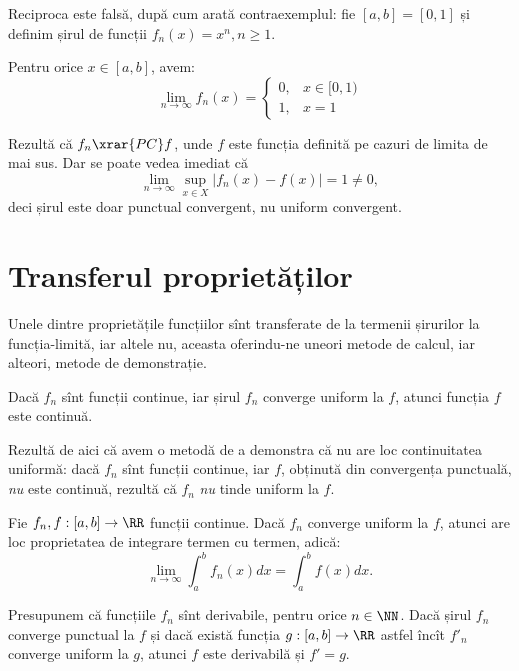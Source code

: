 Reciproca este falsă, după cum arată contraexemplul: fie $ [a, b] = [0,1] $
și definim șirul de funcții $ f_n(x) = x^n, n \geq 1 $.

Pentru orice $ x \in [a, b] $, avem:
\[
  \lim_{n \to \infty} f_n(x) = %
  \begin{cases}
    0, & x \in [0, 1) \\
    1, & x = 1
  \end{cases}
\]

Rezultă că $ f_n \xrar{PC} f $, unde $ f $ este funcția definită pe
cazuri de limita de mai sus. Dar se poate vedea imediat că
\[
  \lim_{n \to \infty} \sup_{x \in X} |f_n(x) - f(x)| = 1 \neq 0,
\]
deci șirul este doar punctual convergent, nu uniform convergent.

\section{Transferul proprietăților}

Unele dintre proprietățile funcțiilor sînt transferate de la termenii șirurilor
la funcția-limită, iar altele nu, aceasta oferindu-ne uneori metode de calcul,
iar alteori, metode de demonstrație.

\begin{theorem}\label{thm:transf-cont}
  Dacă $ f_n $ sînt funcții continue, iar șirul $ f_n $ converge uniform
  la $ f $, atunci funcția $ f $ este continuă.
\end{theorem}

Rezultă de aici că avem o metodă de a demonstra că nu are loc
continuitatea uniformă: dacă $ f_n $ sînt funcții continue, iar $ f $,
obținută din convergența punctuală, \emph{nu} este continuă, rezultă
că $ f_n $ \emph{nu} tinde uniform la $ f $.

\begin{theorem}\label{thm:int-termen}
  Fie $ f_n, f : [a, b] \to \RR $ funcții continue. Dacă $ f_n $
  converge uniform la $ f $, atunci are loc proprietatea de
  integrare termen cu termen, adică:
  \[
    \lim_{n \to \infty} \int_a^b f_n(x) dx = \int_a^b f(x) dx.
  \]
\end{theorem}

\begin{theorem}\label{thm:derivare-termen}
  Presupunem că funcțiile $ f_n $ sînt derivabile, pentru orice $ n \in \NN $.
  Dacă șirul $ f_n $ converge punctual la $ f $ și dacă există funcția
  $ g : [a, b] \to \RR $ astfel încît $ f'_n $ converge uniform la $ g $,
  atunci $ f $ este derivabilă și $ f' = g $.
\end{theorem}

